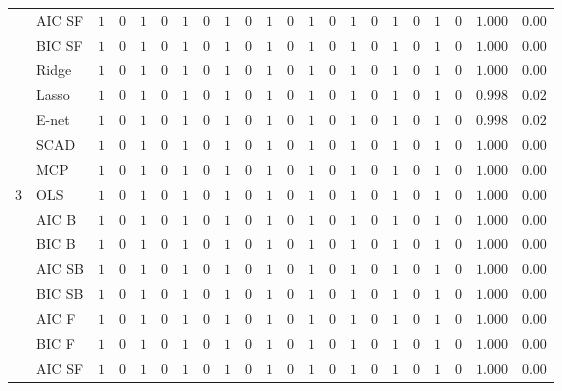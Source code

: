 \begin{tabular}{llllllllllllllllllllll}
	& AIC SF  & $1$ & $0$ & $1$ & $0$ & $1$ & $0$ & $1$ & $0$ & $1$ & $0$ & $1$ & $0$ & $1$ & $0$ & $1$ & $0$ & $1$ & $0$ & $1.000$ & $0.00$ \\
	& BIC SF  & $1$ & $0$ & $1$ & $0$ & $1$ & $0$ & $1$ & $0$ & $1$ & $0$ & $1$ & $0$ & $1$ & $0$ & $1$ & $0$ & $1$ & $0$ & $1.000$ & $0.00$ \\
	& Ridge  & $1$ & $0$ & $1$ & $0$ & $1$ & $0$ & $1$ & $0$ & $1$ & $0$ & $1$ & $0$ & $1$ & $0$ & $1$ & $0$ & $1$ & $0$ & $1.000$ & $0.00$ \\
	& Lasso  & $1$ & $0$ & $1$ & $0$ & $1$ & $0$ & $1$ & $0$ & $1$ & $0$ & $1$ & $0$ & $1$ & $0$ & $1$ & $0$ & $1$ & $0$ & $0.998$ & $0.02$ \\
	& E-net  & $1$ & $0$ & $1$ & $0$ & $1$ & $0$ & $1$ & $0$ & $1$ & $0$ & $1$ & $0$ & $1$ & $0$ & $1$ & $0$ & $1$ & $0$ & $0.998$ & $0.02$ \\
	& SCAD  & $1$ & $0$ & $1$ & $0$ & $1$ & $0$ & $1$ & $0$ & $1$ & $0$ & $1$ & $0$ & $1$ & $0$ & $1$ & $0$ & $1$ & $0$ & $1.000$ & $0.00$ \\
	& MCP  & $1$ & $0$ & $1$ & $0$ & $1$ & $0$ & $1$ & $0$ & $1$ & $0$ & $1$ & $0$ & $1$ & $0$ & $1$ & $0$ & $1$ & $0$ & $1.000$ & $0.00$ \\
	3 & OLS  & $1$ & $0$ & $1$ & $0$ & $1$ & $0$ & $1$ & $0$ & $1$ & $0$ & $1$ & $0$ & $1$ & $0$ & $1$ & $0$ & $1$ & $0$ & $1.000$ & $0.00$ \\
	& AIC B  & $1$ & $0$ & $1$ & $0$ & $1$ & $0$ & $1$ & $0$ & $1$ & $0$ & $1$ & $0$ & $1$ & $0$ & $1$ & $0$ & $1$ & $0$ & $1.000$ & $0.00$ \\
	& BIC B  & $1$ & $0$ & $1$ & $0$ & $1$ & $0$ & $1$ & $0$ & $1$ & $0$ & $1$ & $0$ & $1$ & $0$ & $1$ & $0$ & $1$ & $0$ & $1.000$ & $0.00$ \\
	& AIC SB  & $1$ & $0$ & $1$ & $0$ & $1$ & $0$ & $1$ & $0$ & $1$ & $0$ & $1$ & $0$ & $1$ & $0$ & $1$ & $0$ & $1$ & $0$ & $1.000$ & $0.00$ \\
	& BIC SB  & $1$ & $0$ & $1$ & $0$ & $1$ & $0$ & $1$ & $0$ & $1$ & $0$ & $1$ & $0$ & $1$ & $0$ & $1$ & $0$ & $1$ & $0$ & $1.000$ & $0.00$ \\
	& AIC F  & $1$ & $0$ & $1$ & $0$ & $1$ & $0$ & $1$ & $0$ & $1$ & $0$ & $1$ & $0$ & $1$ & $0$ & $1$ & $0$ & $1$ & $0$ & $1.000$ & $0.00$ \\
	& BIC F  & $1$ & $0$ & $1$ & $0$ & $1$ & $0$ & $1$ & $0$ & $1$ & $0$ & $1$ & $0$ & $1$ & $0$ & $1$ & $0$ & $1$ & $0$ & $1.000$ & $0.00$ \\
	& AIC SF  & $1$ & $0$ & $1$ & $0$ & $1$ & $0$ & $1$ & $0$ & $1$ & $0$ & $1$ & $0$ & $1$ & $0$ & $1$ & $0$ & $1$ & $0$ & $1.000$ & $0.00$ \\

\end{tabular}
